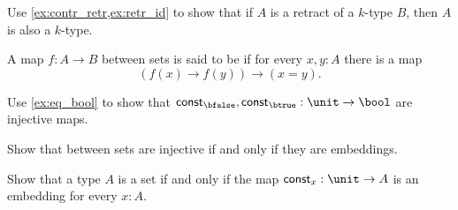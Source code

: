 \begin{exercises}
\item Use \autoref{ex:contr_retr,ex:retr_id} to show that if $A$ is a retract of a $k$-type $B$, then $A$ is also a $k$-type.
\item \label{ex:injective}A map $f:A\to B$ between sets is said to be  if for every $x,y:A$ there is a map
\begin{equation*}
(f(x)\to f(y))\to (x=y).
\end{equation*}
\begin{subexenum}
\item Use \cref{ex:eq_bool} to show that $\mathsf{const}_\bfalse,\mathsf{const}_\btrue:\unit\to \bool$ are injective maps.
\item Show that between sets are injective if and only if they are embeddings.
\item Show that a type $A$ is a set if and only if the map $\mathsf{const}_x:\unit\to A$ is an embedding for every $x:A$.
\end{subexenum}
\end{exercises}
